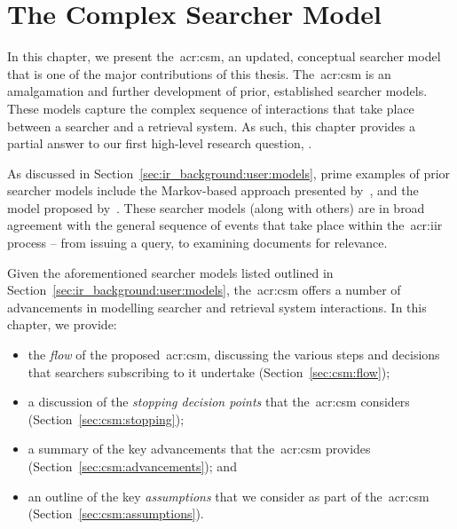 
\chapter[The Complex Searcher Model]{The Complex Searcher Model}\label{chap:csm}
In this chapter, we present the~\gls{acr:csm}, an updated, conceptual searcher model that is one of the major contributions of this thesis. The~\gls{acr:csm} is an amalgamation and further development of prior, established searcher models. These models capture the complex sequence of interactions that take place between a searcher and a retrieval system. As such, this chapter provides a partial answer to our first high-level research question, .

\begin{figure}[h]
    \centering
    \vspace{4mm}
    \label{fig:model_example}
    \vspace{-5mm}
\end{figure}

As discussed in Section~\ref{sec:ir_background:user:models}, prime examples of prior searcher models include the Markov-based approach presented by~\cite{baskaya2013behavioural_factors}, and the model proposed by~\cite{thomas2014modelling_behaviour}. These searcher models (along with others) are in broad agreement with the general sequence of events that take place within the~\gls{acr:iir} process -- from issuing a query, to examining documents for relevance.

Given the aforementioned searcher models listed outlined in Section~\ref{sec:ir_background:user:models}, the~\gls{acr:csm} offers a number of advancements in modelling searcher and retrieval system interactions. In this chapter, we provide:

\begin{itemize}
    \item{the \emph{flow} of the proposed~\gls{acr:csm}, discussing the various steps and decisions that searchers subscribing to it undertake (Section~\ref{sec:csm:flow});}
    \item{a discussion of the \emph{stopping decision points} that the~\gls{acr:csm} considers (Section~\ref{sec:csm:stopping});}
    \item{a summary of the key advancements that the~\gls{acr:csm} provides (Section~\ref{sec:csm:advancements}); and}
    \item{an outline of the key \emph{assumptions} that we consider as part of the~\gls{acr:csm} (Section~\ref{sec:csm:assumptions}).}
\end{itemize}

